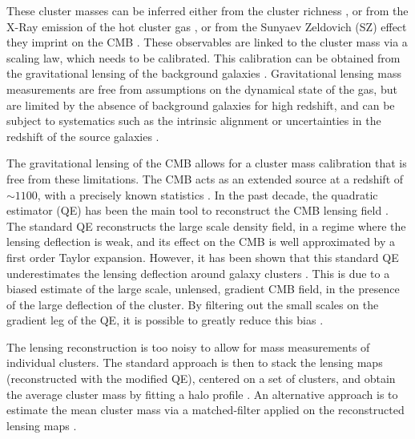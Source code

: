 \documentclass[prd, superscriptaddress, tightenlines, longbibliography, nofootinbib, eqsecnum, amsfonts, amsmath, floatfix, twocolumn, notitlepage]{revtex4-2}
\begin{document}
These cluster masses can be inferred either from the cluster richness \cite[e.g.][]{Koester:2007bj,DES:2015mqu,Andreon:2016eck, Farahi:2016xux,Simet:2016mzg}, or from the X-Ray emission of the hot cluster gas \cite[e.g.][]{Arnaud:2005ur, Arnaud:2007br, Vikhlinin:2008ym}, or from the Sunyaev Zeldovich (SZ) effect they imprint on the CMB \cite[e.g.][]{Vanderlinde:2010eb, Planck:2013lkt,Planck:2015lwi}. These observables are linked to the cluster mass via a scaling law, which needs to be calibrated. 
This calibration can be obtained from the gravitational lensing of the background galaxies \cite{vonderLinden:2014haa, Hoekstra:2015gda, Smith:2015qhs, Sereno:2017zcn, Penna-Lima:2016tvo, Bellagamba:2018gec,Miyatake:2018lpb, Umetsu:2020wlf}. Gravitational lensing mass measurements are free from assumptions on the dynamical state of the gas, but are limited by the absence of background galaxies for high redshift, and can be subject to systematics such as the intrinsic alignment or uncertainties in the redshift of the source galaxies \cite{Becker:2010xj}.

The gravitational lensing of the CMB allows for a cluster mass calibration that is free from these limitations. The CMB acts as an extended source at a redshift of $\sim 1100$, with a precisely known statistics
\cite{Seljak:1999zn, Holder:2004rp, Baxter:2014frs, Melin:2014uaa, Louis:2016gvv, DES:2017fyz, Geach:2017crt, DES:2018myw,Zubeldia:2019brr, ACT:2020izl, SPT:2021efh}. 
In the past decade, the quadratic estimator (QE) has been the main tool to reconstruct the CMB lensing field \cite{Hu:2001tn, Hu:2001kj, Okamoto:2003zw, Planck:2018lbu}. The standard QE reconstructs the large scale density field, in a regime where the lensing deflection is weak, and its effect on the CMB is well approximated by a first order Taylor expansion. 
However, it has been shown that this standard QE underestimates the lensing deflection around galaxy clusters \cite{Maturi:2004zj}. This is due to a biased estimate of the large scale, unlensed, gradient CMB field, in the presence of the large deflection of the cluster. By filtering out the small scales on the gradient leg of the QE, it is possible to greatly reduce this bias \cite{Hu:2007bt}.

The lensing reconstruction is too noisy to allow for mass measurements of individual clusters. The standard approach is then to stack the lensing maps (reconstructed with the modified QE), centered on a set of clusters, and obtain the average cluster mass by fitting a halo profile \cite{DES:2017fyz, Geach:2017crt, DES:2018myw, ACT:2020izl}. An alternative approach is to estimate the mean cluster mass via a matched-filter applied on the reconstructed lensing maps \cite{Melin:2014uaa, Louis:2016gvv, Zubeldia:2019brr}.
\end{document}
